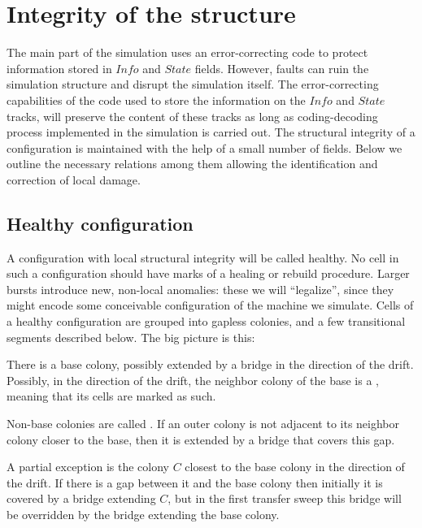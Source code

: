 \documentclass[12pt]{memoir}
\newcommand{\authnote}[3]
{\text{{ \textcolor{#3}{\( \langle\hspace{-0.2em}\langle \)\textsf{\footnotesize #1: #2}\( \rangle\hspace{-0.2em}\rangle \)}}}}
\newcommand{\authnote}[2]{}
\newcommand{\Pnote}[1]{{\authnote{Peter}{#1}{cyan}}}
\newcommand{\fld}[1]{\ensuremath{\textit{#1}}}
\newcommand{\Info}{\fld{Info}}
\newcommand{\State}{\fld{State}}
\begin{document}
\section{Integrity of the structure}            \label{sec:integrity}

The main part of the simulation uses an error-correcting
code to protect information stored in \( \Info \) and \( \State \) fields.
However, faults can ruin the simulation structure and disrupt the simulation itself.
The error-correcting capabilities of the code 
used to store the information on the \( \Info \) and
\( \State \) tracks, will preserve the content of these tracks as long as coding-decoding
process implemented in the simulation is carried out.
The structural integrity of a configuration is maintained with the help of a small number
of fields.
Below we outline the necessary relations among them 
allowing the identification and correction of local damage.

\subsection{Healthy configuration}

A configuration with local structural integrity will be called healthy.
No cell in such a configuration should have marks of a healing or
rebuild procedure.
Larger bursts introduce new, non-local anomalies: 
these we will ``legalize'', since they might encode
some conceivable configuration of the machine we simulate.
Cells of a healthy configuration are grouped into gapless colonies, and 
a few transitional segments described below.
The big picture is this:
\begin{bullets}
\item There is a base colony, possibly extended by a bridge in the direction of
  the drift.
Possibly, in the direction of the drift, the neighbor colony of the base is a 
, meaning that its cells are marked as such.
\item Non-base colonies are called .
If an outer colony 
is not adjacent to its neighbor colony closer to the base,
then it is extended by a bridge that covers this gap.

A partial exception is the colony \( C \) closest to the base colony in the direction of the
drift.
If there is a gap between it and the base colony then initially it is covered by 
a bridge extending \( C \), but in the first transfer sweep this bridge will be
overridden by the bridge extending the base colony.
\end{bullets}
\Pnote{Pictures!}
\end{document}
